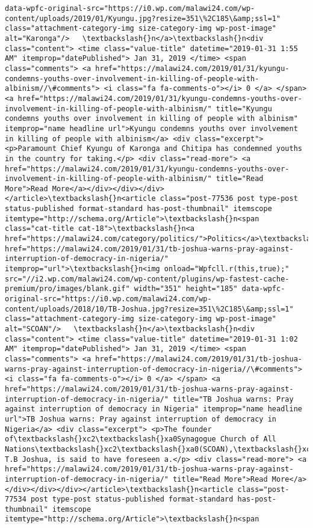 \documentclass[11pt]{article}
\begin{document}
\begin{Verbatim}[commandchars=\\\{\}]
data-wpfc-original-src="https://i0.wp.com/malawi24.com/wp-content/uploads/2019/01/Kyungu.jpg?resize=351\%2C185\&amp;ssl=1" class="attachment-category-img size-category-img wp-post-image" alt="Karonga"/>   \textbackslash{}n</a>\textbackslash{}n<div class="content"> <time class="value-title" datetime="2019-01-31 1:55 AM" itemprop="datePublished"> Jan 31, 2019 </time> <span class="comments"> <a href="https://malawi24.com/2019/01/31/kyungu-condemns-youths-over-involvement-in-killing-of-people-with-albinism//\#comments"> <i class="fa fa-comments-o"></i> 0 </a> </span> <a href="https://malawi24.com/2019/01/31/kyungu-condemns-youths-over-involvement-in-killing-of-people-with-albinism/" title="Kyungu condemns youths over involvement in killing of people with albinism" itemprop="name headline url">Kyungu condemns youths over involvement in killing of people with albinism</a> <div class="excerpt"> <p>Paramount Chief Kyungu of Karonga and Chitipa has condemned youths in the country for taking.</p> <div class="read-more"> <a href="https://malawi24.com/2019/01/31/kyungu-condemns-youths-over-involvement-in-killing-of-people-with-albinism/" title="Read More">Read More</a></div></div></div></article>\textbackslash{}n<article class="post-77536 post type-post status-published format-standard has-post-thumbnail" itemscope itemtype="http://schema.org/Article">\textbackslash{}n<span class="cat-title cat-18">\textbackslash{}n<a href="https://malawi24.com/category/politics/">Politics</a>\textbackslash{}n</span>\textbackslash{}n<a href="https://malawi24.com/2019/01/31/tb-joshua-warns-pray-against-interruption-of-democracy-in-nigeria/" itemprop="url">\textbackslash{}n<img onload="Wpfcll.r(this,true);" src="//i2.wp.com/malawi24.com/wp-content/plugins/wp-fastest-cache-premium/pro/images/blank.gif" width="351" height="185" data-wpfc-original-src="https://i0.wp.com/malawi24.com/wp-content/uploads/2018/10/TB-Joshua.jpg?resize=351\%2C185\&amp;ssl=1" class="attachment-category-img size-category-img wp-post-image" alt="SCOAN"/>   \textbackslash{}n</a>\textbackslash{}n<div class="content"> <time class="value-title" datetime="2019-01-31 1:02 AM" itemprop="datePublished"> Jan 31, 2019 </time> <span class="comments"> <a href="https://malawi24.com/2019/01/31/tb-joshua-warns-pray-against-interruption-of-democracy-in-nigeria//\#comments"> <i class="fa fa-comments-o"></i> 0 </a> </span> <a href="https://malawi24.com/2019/01/31/tb-joshua-warns-pray-against-interruption-of-democracy-in-nigeria/" title="TB Joshua warns: Pray against interruption of democracy in Nigeria" itemprop="name headline url">TB Joshua warns: Pray against interruption of democracy in Nigeria</a> <div class="excerpt"> <p>The founder of\textbackslash{}xc2\textbackslash{}xa0Synagogue Church of All Nations\textbackslash{}xc2\textbackslash{}xa0(SCOAN),\textbackslash{}xc2\textbackslash{}xa0Prophet T.B Joshua, is said to have foreseen a.</p> <div class="read-more"> <a href="https://malawi24.com/2019/01/31/tb-joshua-warns-pray-against-interruption-of-democracy-in-nigeria/" title="Read More">Read More</a></div></div></div></article>\textbackslash{}n<article class="post-77534 post type-post status-published format-standard has-post-thumbnail" itemscope itemtype="http://schema.org/Article">\textbackslash{}n<span 
\end{Verbatim}
\end{document}
